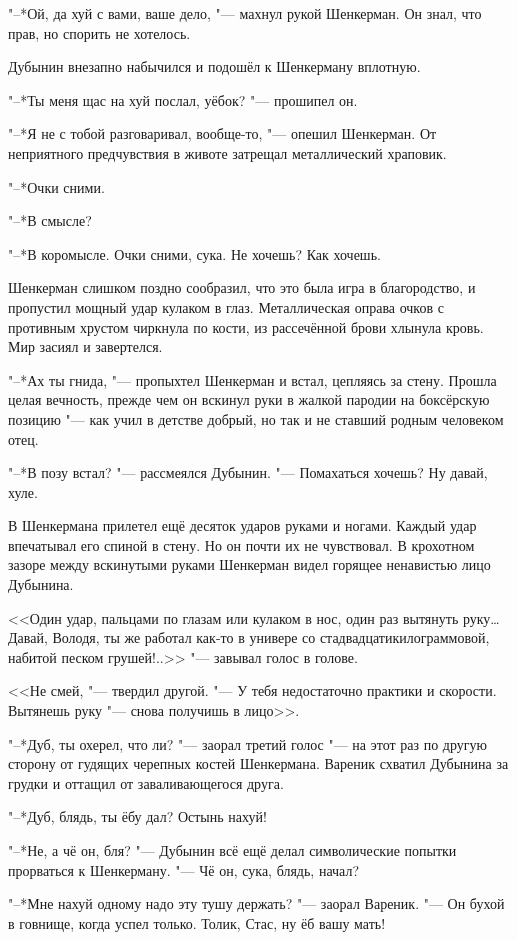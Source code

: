 "--*Ой, да хуй с вами, ваше дело, "--- махнул рукой Шенкерман.
Он знал, что прав, но спорить не хотелось.

Дубынин внезапно набычился и подошёл к Шенкерману вплотную.

"--*Ты меня щас на хуй послал, уёбок? "--- прошипел он.

"--*Я не с тобой разговаривал, вообще-то, "--- опешил Шенкерман.
От неприятного предчувствия в животе затрещал металлический храповик.

"--*Очки сними.

"--*В смысле?

"--*В коромысле.
Очки сними, сука.
Не хочешь?
Как хочешь.

Шенкерман слишком поздно сообразил, что это была игра в благородство, и пропустил мощный удар кулаком в глаз.
Металлическая оправа очков с противным хрустом чиркнула по кости, из рассечённой брови хлынула кровь.
Мир засиял и завертелся.

"--*Ах ты гнида, "--- пропыхтел Шенкерман и встал, цепляясь за стену.
Прошла целая вечность, прежде чем он вскинул руки в жалкой пародии на боксёрскую позицию "--- как учил в детстве добрый, но так и не ставший родным человеком отец.

"--*В позу встал? "--- рассмеялся Дубынин.
"--- Помахаться хочешь?
Ну давай, хуле.

В Шенкермана прилетел ещё десяток ударов руками и ногами.
Каждый удар впечатывал его спиной в стену.
Но он почти их не чувствовал.
В крохотном зазоре между вскинутыми руками Шенкерман видел горящее ненавистью лицо Дубынина.

<<Один удар, пальцами по глазам или кулаком в нос, один раз вытянуть руку\ldots{}
Давай, Володя, ты же работал как-то в универе со стадвадцатикилограммовой, набитой песком грушей!..>> "--- завывал голос в голове.

<<Не смей, "--- твердил другой.
"--- У тебя недостаточно практики и скорости.
Вытянешь руку "--- снова получишь в лицо>>.

"--*Дуб, ты охерел, что ли? "--- заорал третий голос "--- на этот раз по другую сторону от гудящих черепных костей Шенкермана.
Вареник схватил Дубынина за грудки и оттащил от заваливающегося друга.

"--*Дуб, блядь, ты ёбу дал?
Остынь нахуй!

"--*Не, а чё он, бля? "--- Дубынин всё ещё делал символические попытки прорваться к Шенкерману.
"--- Чё он, сука, блядь, начал?

"--*Мне нахуй одному надо эту тушу держать? "--- заорал Вареник.
"--- Он бухой в говнище, когда успел только.
Толик, Стас, ну ёб вашу мать!

